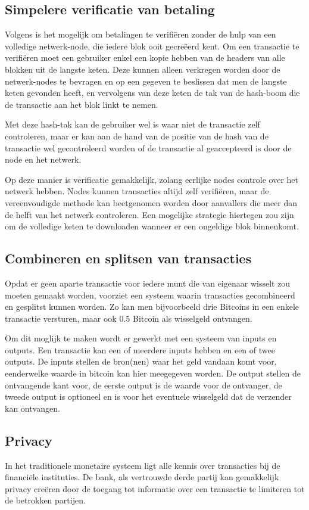 		\subsection{Simpelere verificatie van betaling}
		Volgens \textcite{Nakamoto2008} is het mogelijk om betalingen te verifiëren zonder de hulp van een volledige netwerk-node, die iedere blok ooit gecreëerd kent. Om een transactie te verifiëren moet een gebruiker enkel een kopie hebben van de headers van alle blokken uit de langste keten. Deze kunnen alleen verkregen worden door de netwerk-nodes te bevragen en op een gegeven te beslissen dat men de langste keten gevonden heeft, en vervolgens van deze keten de tak van de hash-boom die de transactie aan het blok linkt te nemen.
	
		Met deze hash-tak kan de gebruiker wel is waar niet de transactie zelf controleren, maar er kan aan de hand van de positie van de hash van de transactie wel gecontroleerd worden of de transactie al geaccepteerd is door de node en het netwerk.
		
		Op deze manier is verificatie gemakkelijk, zolang eerlijke nodes controle over het netwerk hebben. Nodes kunnen transacties altijd zelf verifiëren, maar de vereenvoudigde methode kan beetgenomen worden door aanvallers die meer dan de helft van het netwerk controleren. Een mogelijke strategie hiertegen zou zijn om de volledige keten te downloaden wanneer er een ongeldige blok binnenkomt. 
	\subsection{Combineren en splitsen van transacties}
	Opdat er geen aparte transactie voor iedere munt die van eigenaar wisselt zou moeten gemaakt worden, voorziet \textcite{Nakamoto2008} een systeem waarin transacties gecombineerd en gesplitst kunnen worden. Zo kan men bijvoorbeeld drie Bitcoins in een enkele transactie versturen, maar ook 0.5 Bitcoin als wisselgeld ontvangen.
	
	Om dit moglijk te maken wordt er gewerkt met een systeem van inputs en outputs. Een transactie kan een of meerdere inputs hebben en een of twee outputs. De inputs stellen de bron(nen) waar het geld vandaan komt voor, eenderwelke waarde in bitcoin kan hier meegegeven worden. De output stellen de ontvangende kant voor, de eerste output is de waarde voor de ontvanger, de tweede output is optioneel en is voor het eventuele wisselgeld dat de verzender kan ontvangen.
	\subsection{Privacy}
	In het traditionele monetaire systeem ligt alle kennis over transacties bij de financiële instituties. De bank, als vertrouwde derde partij kan gemakkelijk privacy creëren door de toegang tot informatie over een transactie te limiteren tot de betrokken partijen. 
	
